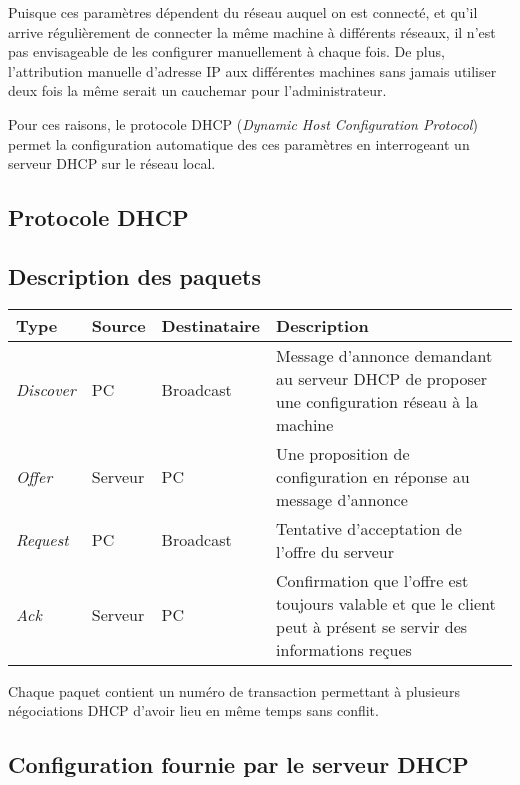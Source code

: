 \documentclass[11pt,a4paper]{article}
\begin{document}
Puisque ces paramètres dépendent du réseau auquel on est connecté, et qu'il arrive régulièrement de connecter la même machine à différents réseaux, il n'est pas envisageable de les configurer manuellement à chaque fois. De plus, l'attribution manuelle d'adresse IP aux différentes machines sans jamais utiliser deux fois la même serait un cauchemar pour l'administrateur.

Pour ces raisons, le protocole DHCP (\textit{Dynamic Host Configuration Protocol}) permet la configuration automatique des ces paramètres en interrogeant un serveur DHCP sur le réseau local.

\subsection{Protocole DHCP}

\subsection{Description des paquets}

\begin{tabular}{|l||l|l|p{9cm}|}
	\hline
	\textbf{Type} & \textbf{Source} & \textbf{Destinataire} & \textbf{Description} \\
	\hline
	\textit{Discover} & PC & Broadcast & Message d'annonce demandant au serveur DHCP de proposer une configuration réseau à la machine \\
	\hline
	\textit{Offer} & Serveur & PC & Une proposition de configuration en réponse au message d'annonce \\
	\hline
	\textit{Request} & PC & Broadcast & Tentative d'acceptation de l'offre du serveur \\
	\hline
	\textit{Ack} & Serveur & PC & Confirmation que l'offre est toujours valable et que le client peut à présent se servir des informations reçues \\
	\hline
\end{tabular}

\vspace{1em}

Chaque paquet contient un numéro de transaction permettant à plusieurs négociations DHCP d'avoir lieu en même temps sans conflit.

\subsection{Configuration fournie par le serveur DHCP}
\end{document}
